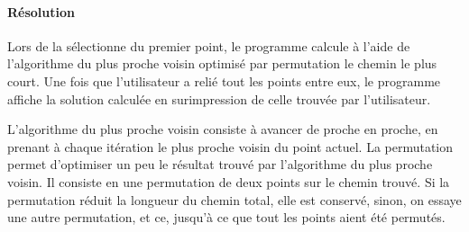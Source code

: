         \paragraph{Résolution}
            Lors de la sélectionne du premier point,
            le programme calcule à l'aide de l'algorithme
            du plus proche voisin optimisé par permutation
            le chemin le plus court.
            Une fois que l'utilisateur a relié tout les points
            entre eux, le programme affiche la solution calculée
            en surimpression de celle trouvée par l'utilisateur.

            L'algorithme du plus proche voisin consiste à avancer
            de proche en proche, en prenant à chaque itération le plus
            proche voisin du point actuel.
            La permutation permet d'optimiser un peu le résultat trouvé
            par l'algorithme du plus proche voisin.
            Il consiste en une permutation de deux points sur le chemin trouvé.
            Si la permutation réduit la longueur du chemin total,
            elle est conservé, sinon, on essaye une autre permutation,
            et ce, jusqu'à ce que tout les points aient été permutés.

